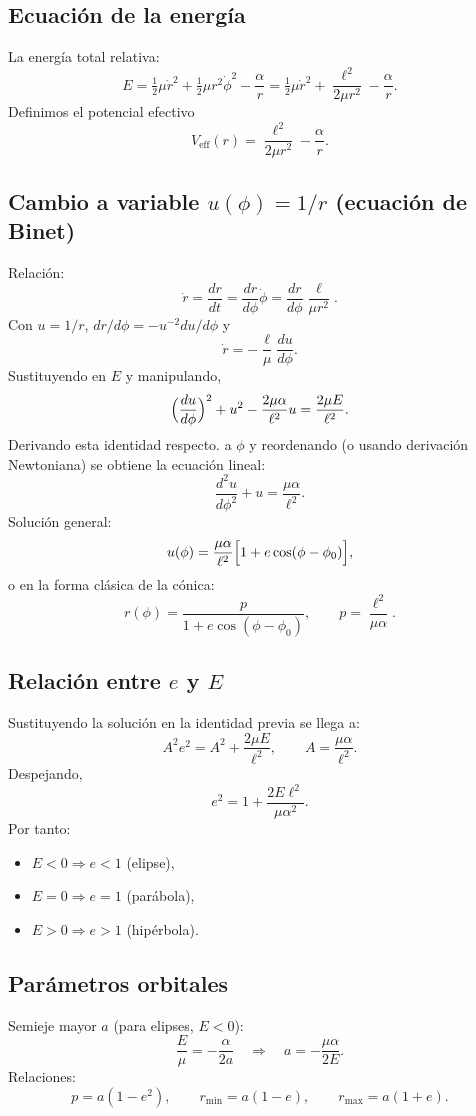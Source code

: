 \documentclass[12pt]{article}
\begin{document}
\subsection*{Ecuación de la energía}
La energía total relativa:
\[
E = \tfrac12\mu\dot r^2 + \tfrac12\mu r^2\dot\phi^2 - \frac{\alpha}{r}
= \tfrac12\mu\dot r^2 + \frac{\ell^2}{2\mu r^2} - \frac{\alpha}{r}.
\]
Definimos el potencial efectivo
\[
V_{\mathrm{eff}}(r) = \frac{\ell^2}{2\mu r^2} - \frac{\alpha}{r}.
\]

\subsection*{Cambio a variable \(u(\phi)=1/r\) (ecuación de Binet)}
Relación:
\[
\dot r = \frac{dr}{dt} = \frac{dr}{d\phi}\dot\phi = \frac{dr}{d\phi}\frac{\ell}{\mu r^2}.
\]
Con \(u=1/r\), \(dr/d\phi = -u^{-2} du/d\phi\) y
\[
\dot r = -\frac{\ell}{\mu}\frac{du}{d\phi}.
\]
Sustituyendo en \(E\) y manipulando,
\[
\Bigl(\frac{du}{d\phi}\Bigr)^2 + u^2 - \frac{2\mu\alpha}{\ell^2}u = \frac{2\mu E}{\ell^2}.
\]
Derivando esta identidad respecto. a \(\phi\) y reordenando (o usando derivación Newtoniana) se obtiene la ecuación lineal:
\[
\frac{d^2 u}{d\phi^2} + u = \frac{\mu\alpha}{\ell^2}.
\]
Solución general:
\[
u(\phi) = \frac{\mu\alpha}{\ell^2}\Bigl[1 + e\cos(\phi-\phi_0)\Bigr],
\]
o en la forma clásica de la cónica:
\[
\boxed{\displaystyle r(\phi) = \frac{p}{1+e\cos(\phi-\phi_0)},\qquad p=\frac{\ell^2}{\mu\alpha}.}
\]

\subsection*{Relación entre \(e\) y \(E\)}
Sustituyendo la solución en la identidad previa se llega a:
\[
A^2 e^2 = A^2 + \frac{2\mu E}{\ell^2},
\qquad A=\frac{\mu\alpha}{\ell^2}.
\]
Despejando,
\[
\boxed{e^2 = 1 + \frac{2E\ell^2}{\mu\alpha^2}.}
\]
Por tanto:
\begin{itemize}
    \item \(E<0 \Rightarrow e<1\) (elipse),
    \item \(E=0 \Rightarrow e=1\) (parábola),
    \item \(E>0 \Rightarrow e>1\) (hipérbola).
\end{itemize}

\subsection*{Parámetros orbitales}
Semieje mayor \(a\) (para elipses, \(E<0\)):
\[
\frac{E}{\mu} = -\frac{\alpha}{2a} \quad\Rightarrow\quad a = -\frac{\mu\alpha}{2E}.
\]
Relaciones:
\[
p = a(1-e^2),\qquad r_{\min} = a(1-e),\qquad r_{\max}=a(1+e).
\]
\end{document}
